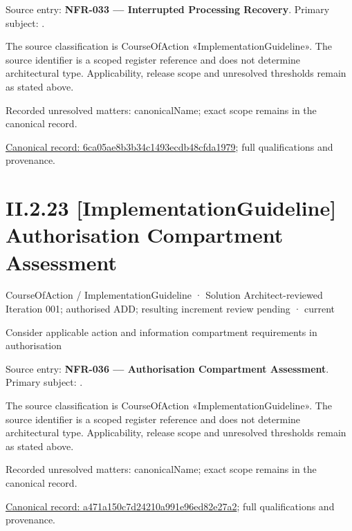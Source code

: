 Source entry: \textbf{NFR-033 — Interrupted Processing Recovery}. Primary subject: \texttt{}.



The source classification is CourseOfAction «ImplementationGuideline». The source identifier is a scoped register reference and does not determine architectural type. Applicability, release scope and unresolved thresholds remain as stated above.


{\small Recorded unresolved matters: canonicalName; exact scope remains in the canonical record.}\par
{\footnotesize \href{../../../../../../../continuum/strategy/course-of-action/implementation-guideline/6ca05ae8b3b34c1493ecdb48cfda1979.md}{Canonical record: 6ca05ae8b3b34c1493ecdb48cfda1979}; full qualifications and provenance.}\par
\section*{II.2.23 [ImplementationGuideline] Authorisation Compartment Assessment}
\label{navigation:II.2.23}

\label{element:a471a150c7d24210a991e96ed82e27a2}
{\small CourseOfAction / ImplementationGuideline · Solution Architect-reviewed Iteration 001; authorised ADD; resulting increment review pending · current}\par

Consider applicable action and information compartment requirements in authorisation



Source entry: \textbf{NFR-036 — Authorisation Compartment Assessment}. Primary subject: \texttt{}.



The source classification is CourseOfAction «ImplementationGuideline». The source identifier is a scoped register reference and does not determine architectural type. Applicability, release scope and unresolved thresholds remain as stated above.


{\small Recorded unresolved matters: canonicalName; exact scope remains in the canonical record.}\par
{\footnotesize \href{../../../../../../../continuum/strategy/course-of-action/implementation-guideline/a471a150c7d24210a991e96ed82e27a2.md}{Canonical record: a471a150c7d24210a991e96ed82e27a2}; full qualifications and provenance.}\par
